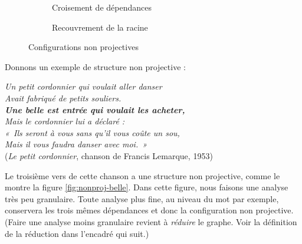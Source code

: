 \begin{figure}
\begin{subfigure}[b]{.5\linewidth}\centering
{}\caption{Croisement de dépendances}\end{subfigure}%
\begin{subfigure}[b]{.5\linewidth}\centering
{}\caption{Recouvrement de la racine}
\end{subfigure}
\caption{\label{fig:nonproj-config}Configurations non projectives}
\end{figure}

Donnons un exemple de structure non projective :

\ea\label{ex:belle-complet}
\textit{Un petit cordonnier qui voulait aller danser}\\
\textit{Avait fabriqué de petits souliers.}\\
\textit{\textbf{Une belle est entrée qui voulait les acheter,}}\\
\textit{Mais le cordonnier lui a déclaré :}\\
\textit{«~Ils seront à vous sans qu’il vous coûte un sou,}\\
\textit{Mais il vous faudra danser avec moi.~»}\\
\textrm{(\textit{Le petit cordonnier}, chanson de Francis Lemarque, 1953)}
\z

Le troisième vers de cette chanson a une structure non projective, comme le montre la figure \ref{fig:nonproj-belle}. Dans cette figure, nous faisons une analyse très peu granulaire. Toute analyse plus fine, au niveau du mot par exemple, conservera les trois mêmes dépendances et donc la configuration non projective. (Faire une analyse moins granulaire revient à \textit{réduire} le graphe. Voir la définition de la réduction dans l’encadré qui suit.) 

